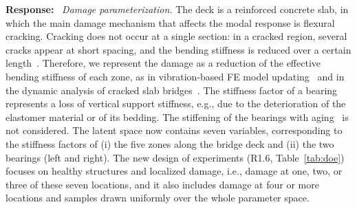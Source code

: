 \documentclass[11pt]{article}
\newenvironment{response}{\par\smallskip\noindent\color{resp}\textbf{Response:}\ }{\par}
\newenvironment{action}{\par\smallskip\noindent\color{resp}\textbf{Action:}\ }{\par}
\newcommand{\tbd}[1]{\textcolor{note}{\textsf{[#1]}}}
\newcommand{\lines}[1]{\tbd{lines #1}}
\begin{document}
\begin{response}
\textit{Damage parameterization.} The deck is a reinforced concrete slab, in which the main damage mechanism that affects the modal response is flexural cracking.
Cracking does not occur at a single section: in a cracked region, several cracks appear at short spacing, and the bending stiffness is reduced over a certain length~\cite{sinha2002simplified}.
Therefore, we represent the damage as a reduction of the effective bending stiffness of each zone, as in vibration-based FE model updating~\cite{teughels2002damage} and in the dynamic analysis of cracked slab bridges~\cite{moliner2017dynamic}.
The stiffness factor of a bearing represents a loss of vertical support stiffness, e.g., due to the deterioration of the elastomer material or of its bedding.
The stiffening of the bearings with aging~\cite{erduran2022effect} is not considered. 
The latent space now contains seven variables, corresponding to the stiffness factors of (i) the five zones along the bridge deck and (ii) the two bearings (left and right). 
The new design of experiments (R1.6, Table~\ref{tab:doe}) focuses on healthy structures and localized damage, i.e., damage at one, two, or three of these seven locations, and it also includes damage at four or more locations and samples drawn uniformly over the whole parameter space. 
\end{response}

\end{document}
